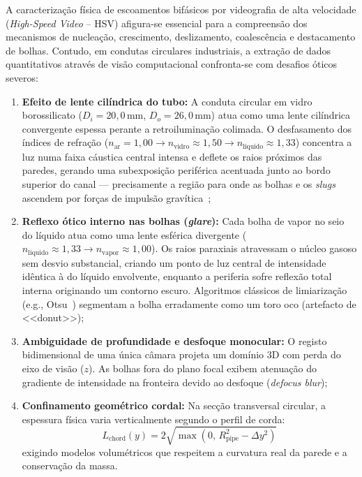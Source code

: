 A caracterização física de escoamentos bifásicos por videografia de alta velocidade (\emph{High-Speed Video} -- HSV) afigura-se essencial para a compreensão dos mecanismos de nucleação, crescimento, deslizamento, coalescência e destacamento de bolhas. Contudo, em condutas circulares industriais, a extração de dados quantitativos através de visão computacional confronta-se com desafios óticos severos:
\begin{enumerate}
    \item \textbf{Efeito de lente cilíndrica do tubo:} A conduta circular em vidro borossilicato ($D_i = 20{,}0\,\mathrm{mm}$, $D_o = 26{,}0\,\mathrm{mm}$) atua como uma lente cilíndrica convergente espessa perante a retroiluminação colimada. O desfasamento dos índices de refração ($n_{\text{ar}} = 1{,}00 \to n_{\text{vidro}} \approx 1{,}50 \to n_{\text{líquido}} \approx 1{,}33$) concentra a luz numa faixa cáustica central intensa e deflete os raios próximos das paredes, gerando uma subexposição periférica acentuada junto ao bordo superior do canal --- precisamente a região para onde as bolhas e os \emph{slugs} ascendem por forças de impulsão gravítica~\cite{branco2026optical};
    \item \textbf{Reflexo ótico interno nas bolhas (\emph{glare}):} Cada bolha de vapor no seio do líquido atua como uma lente esférica divergente ($n_{\text{líquido}} \approx 1{,}33 \to n_{\text{vapor}} \approx 1{,}00$). Os raios paraxiais atravessam o núcleo gasoso sem desvio substancial, criando um ponto de luz central de intensidade idêntica à do líquido envolvente, enquanto a periferia sofre reflexão total interna originando um contorno escuro. Algoritmos clássicos de limiarização (e.g., Otsu~\cite{otsu1979threshold}) segmentam a bolha erradamente como um toro oco (artefacto de <<donut>>);
    \item \textbf{Ambiguidade de profundidade e desfoque monocular:} O registo bidimensional de uma única câmara projeta um domínio 3D com perda do eixo de visão ($z$). As bolhas fora do plano focal exibem atenuação do gradiente de intensidade na fronteira devido ao desfoque (\emph{defocus blur});
    \item \textbf{Confinamento geométrico cordal:} Na secção transversal circular, a espessura física varia verticalmente segundo o perfil de corda:
    \begin{equation}
        L_{\text{chord}}(y) = 2\sqrt{\max\left(0, \, R_{\text{pipe}}^2 - \Delta y^2\right)}
    \end{equation}
    exigindo modelos volumétricos que respeitem a curvatura real da parede e a conservação da massa.
\end{enumerate}

